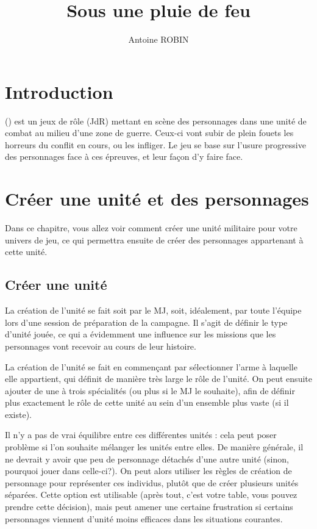 \documentclass{report}
\title{Sous une pluie de feu}
\author{Antoine ROBIN }
\date{}
\begin{document}
\maketitle

\tableofcontents
\begin{multicols}{2}
\setlength{\columnsep}{0.5cm}
\setlength{\columnseprule}{0.5pt}

\chapter*{Introduction}

\nomjeu (\diminutif) est un jeux de rôle (JdR) mettant en scène des personnages dans une unité de combat au milieu d'une zone de guerre. Ceux-ci vont subir de plein fouets les horreurs du conflit en cours, ou les infliger. Le jeu se base sur l'usure progressive des personnages face à ces épreuves, et leur façon d'y faire face.


\chapter{Créer une unité et des personnages}
Dans ce chapitre, vous allez voir comment créer une unité militaire pour votre univers de jeu, ce qui permettra ensuite de créer des personnages appartenant à cette unité.
\section{Créer une unité}
La création de l'unité se fait soit par le MJ, soit, idéalement, par toute l'équipe lors d'une session de préparation de la campagne. Il s'agit de définir le type d'unité jouée, ce qui a évidemment une influence sur les missions que les personnages vont recevoir au cours de leur histoire.

La création de l'unité se fait en commençant par sélectionner l'arme à laquelle elle appartient, qui définit de manière très large le rôle de l'unité. On peut ensuite ajouter de une à trois spécialités (ou plus si le MJ le souhaite), afin de définir plus exactement le rôle de cette unité au sein d'un ensemble plus vaste (si il existe). 


Il n'y a pas de vrai équilibre entre ces différentes unités : cela peut poser problème si l'on souhaite mélanger les unités entre elles. De manière générale, il ne devrait y avoir que peu de personnage détachés d'une autre unité (sinon, pourquoi jouer dans celle-ci?). On peut alors utiliser les règles de création de personnage pour représenter ces individus, plutôt que de créer plusieurs unités séparées. Cette option est utilisable (après tout, c'est votre table, vous pouvez prendre cette décision), mais peut amener une certaine frustration si certains personnages viennent d'unité moins efficaces dans les situations courantes.


\end{multicols}
\end{document}
